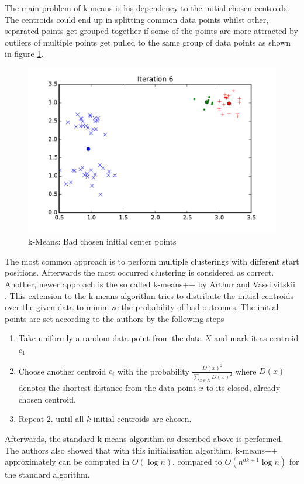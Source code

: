 
The main problem of k-means is his dependency to the initial chosen centroids. The centroids could end up in splitting common data points whilst other, separated points get grouped together if some of the points are more attracted by outliers of multiple points get pulled to the same group of data points as shown in figure \ref{fig:kmeans_bad}.


\begin{figure}[h]
\includegraphics[width=0.7\linewidth]{images/kmeans_bad}
\caption{k-Means: Bad chosen initial center points}
\label{fig:kmeans_bad}
\end{figure}

The most common approach is to perform multiple clusterings with different start positions. Afterwards the most occurred clustering is considered as correct. Another, newer approach is the so called k-means++ by Arthur and Vassilvitskii \cite{Arthur:2007:KAC:1283383.1283494}. This extension to the k-means algorithm tries to distribute the initial centroids over the given data to minimize the probability of bad outcomes. The initial points are set according to the authors by the following steps

\begin{enumerate}
    \item Take uniformly a random data point from the data $X$ and mark it as centroid $c_1$
    \item Choose another centroid $c_i$ with the probability $\frac{D(x)^2}{\sum_{x \in X} D(x)^2}$ where $D(x)$ denotes the shortest distance from the data point $x$ to its closed, already chosen centroid.
    \item Repeat 2. until all $k$ initial centroids are chosen.
\end{enumerate}

Afterwards, the standard k-means algorithm as described above is performed. The authors also showed that with this initialization algorithm, k-means++ approximately can be computed in $O(\log n)$, compared to $O(n^{dk+1} \log n)$ for the standard algorithm.
